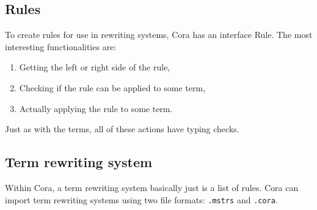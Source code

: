 \subsection{Rules}
To create rules for use in rewriting systems, Cora has an interface Rule. The most interesting functionalities are: 
\begin{enumerate}
    \itemsep0em
    \item Getting the left or right side of the rule,
    \item Checking if the rule can be applied to some term,
    \item Actually applying the rule to some term.
\end{enumerate}
Just as with the terms, all of these actions have typing checks. 
\subsection{Term rewriting system}
Within Cora, a term rewriting system basically just is a list of rules. Cora can import term rewriting systems using two file formats: \texttt{.mstrs} and \texttt{.cora}. 